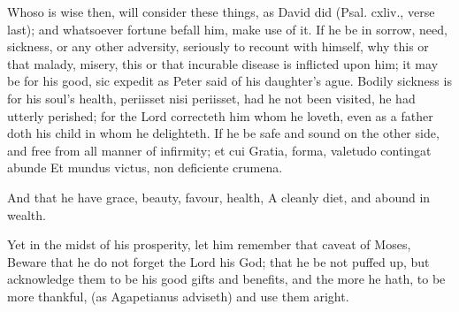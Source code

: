 {Whoso is wise then, will consider these things, as David did (Psal. cxliv., verse last); and whatsoever fortune befall him, make use of it.
If he be in sorrow, need, sickness, or any other adversity, seriously to recount with himself, why this or that malady, misery, this or that incurable disease is inflicted upon him; it may be for his good, sic expedit as Peter said of his daughter's ague.
Bodily sickness is for his soul's health, periisset nisi periisset, had he not been visited, he had utterly perished; for the Lord correcteth him whom he loveth, even as a father doth his child in whom he delighteth.
If he be safe and sound on the other side, and free from all manner of infirmity; et cui Gratia, forma, valetudo contingat abunde Et mundus victus, non deficiente crumena.

And that he have grace, beauty, favour, health,
A cleanly diet, and abound in wealth.

Yet in the midst of his prosperity, let him remember that caveat of
Moses, Beware that he do not forget the Lord his God; that he be
not puffed up, but acknowledge them to be his good gifts and benefits,
and the more he hath, to be more thankful, (as Agapetianus
adviseth) and use them aright.

}
